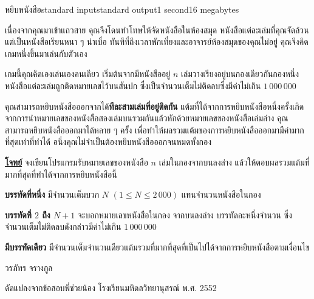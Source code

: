 \documentclass[11pt,a4paper]{article}
\begin{document}
\begin{problem}{หยิบหนังสือ}{standard input}{standard output}{1 second}{16 megabytes}

เนื่องจากคุณมาเข้าแถวสาย คุณจึงโดนทำโทษให้จัดหนังสือในห้องสมุด หนังสือแต่ละเล่มที่คุณจัดล้วนแต่เป็นหนังสือเรียนหนา ๆ น่าเบื่อ  ทันทีที่ถึงเวลาพักเที่ยงและอาจารย์ห้องสมุดของคุณไม่อยู่ คุณจึงคิดเกมหนึ่งขึ้นมาเล่นกับตัวเอง

เกมนี้คุณคิดเองเล่นเองคนเดียว เริ่มต้นจากมีหนังสืออยู่ $n$ เล่มวางเรียงอยู่บนกองเดียวกันกองหนึ่ง หนังสือแต่ละเล่มถูกติดหมายเลขไว้บนสันปก ซึ่งเป็นจำนวนเต็มไม่ติดลบซึ่งมีค่าไม่เกิน $1\,000\,000$

คุณสามารถหยิบหนังสือออกจากได้\textbf{ทีละสามเล่มที่อยู่ติดกัน}  แต้มที่ได้จากการหยิบหนังสือหนึ่งครั้งเกิดจากการนำหมายเลขของหนังสือสองเล่มบนรวมกันแล้วหักด้วยหมายเลขของหนังสือเล่มล่าง  คุณสามารถหยิบหนังสือออกมาได้หลาย ๆ ครั้ง เพื่อทำให้ผลรวมแต้มของการหยิบหนังสือออกมามีค่ามากที่สุดเท่าที่ทำได้  อนึ่งคุณไม่จำเป็นต้องหยิบหนังสือออกจนหมดทั้งกอง
    

\bigskip
\underline{\textbf{โจทย์}} จงเขียนโปรแกรมรับหมายเลขของหนังสือ $n$ เล่มในกองจากบนลงล่าง แล้วให้ตอบผลรวมแต้มที่มากที่สุดที่ทำได้จากการหยิบหนังสือนี้  


\InputFile

 \textbf{บรรทัดที่หนึ่ง} มีจำนวนเต็มบวก $N$ $(1 \leq N \leq 2\,000)$ แทนจำนวนหนังสือในกอง
 
\textbf{บรรทัดที่ $2$ ถึง $N+1$} จะบอกหมายเลขหนังสือในกอง จากบนลงล่าง บรรทัดละหนึ่งจำนวน ซึ่งจำนวนเต็มไม่ติดลบดังกล่าวมีค่าไม่เกิน $1\,000\,000$



\OutputFile

\textbf{มีบรรทัดเดียว} มีจำนวนเต็มจำนวนเดียวแต้มรวมที่มากที่สุดที่เป็นไปได้จากการหยิบหนังสือตามเงื่อนไข

\Examples

\begin{example}
%
%
%
\end{example}

  
\Source

วรภัทร จรางกูล

ดัดแปลงจากข้อสอบพี่ช่วยน้อง โรงเรียนมหิดลวิทยานุสรณ์ พ.ศ. 2552


\end{problem}
\end{document}
